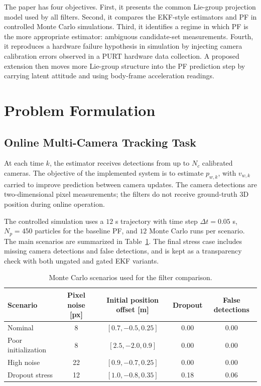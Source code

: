 \documentclass{aiaa-tc}
\begin{document}
The paper has four objectives.  First, it presents the common Lie-group
projection model used by all filters.  Second, it compares the EKF-style
estimators and PF in controlled Monte Carlo simulations.  Third, it identifies
a regime in which PF is the more appropriate estimator: ambiguous candidate-set
measurements.  Fourth, it reproduces a hardware failure hypothesis in
simulation by injecting camera calibration errors observed in a PURT hardware
data collection.  A proposed extension then moves more Lie-group structure into
the PF prediction step by carrying latent attitude and using body-frame
acceleration readings.

\section{Problem Formulation}

\subsection{Online Multi-Camera Tracking Task}

At each time \(k\), the estimator receives detections from up to \(N_c\)
calibrated cameras.  The objective of the implemented system is to estimate
\(p_{w,k}\), with \(v_{w,k}\) carried to improve prediction between camera
updates.  The camera detections are two-dimensional pixel measurements; the
filters do not receive ground-truth 3D position during online operation.

The controlled simulation uses a \(12\) s trajectory with time step
\(\Delta t=0.05\) s, \(N_p=450\) particles for the baseline PF, and \(12\)
Monte Carlo runs per scenario.  The main scenarios are summarized in
Table~\ref{tab:scenarios}.  The final stress case includes missing camera
detections and false detections, and is kept as a transparency check with both
ungated and gated EKF variants.

\begin{table}[htbp]
\centering
\caption{Monte Carlo scenarios used for the filter comparison.}
\label{tab:scenarios}
\begin{tabular}{lcccc}
\toprule
Scenario & Pixel noise [px] & Initial position offset [m] & Dropout & False detections \\
\midrule
Nominal & 8 & \([0.7,-0.5,0.25]\) & 0.00 & 0.00 \\
Poor initialization & 8 & \([2.5,-2.0,0.9]\) & 0.00 & 0.00 \\
High noise & 22 & \([0.9,-0.7,0.25]\) & 0.00 & 0.00 \\
Dropout stress & 12 & \([1.0,-0.8,0.35]\) & 0.18 & 0.06 \\
\bottomrule
\end{tabular}
\end{table}
\end{document}
